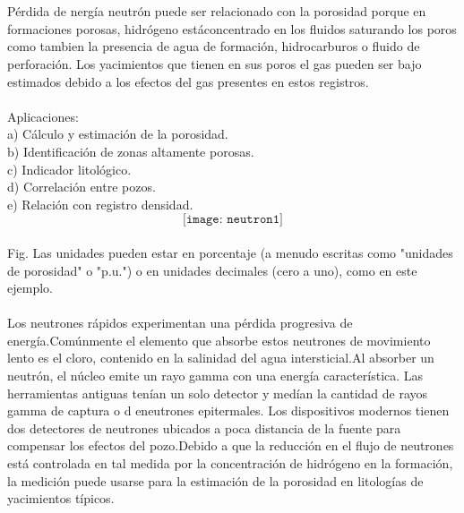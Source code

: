 \documentclass[10pt,a4paper]{report}
\begin{document}
\\\\ Pérdida de nergía neutrón puede ser relacionado con la porosidad porque en formaciones porosas, hidrógeno estáconcentrado en los fluidos saturando los poros como tambien la presencia de agua de formación, hidrocarburos o fluido de perforación. Los yacimientos que tienen en sus poros el gas pueden ser bajo estimados debido a los efectos del gas presentes en estos registros.
\\\\Aplicaciones: 
\\ a) Cálculo y estimación de la porosidad.
\\ b) Identificación de zonas altamente porosas.
\\ c) Indicador litológico. 
\\ d) Correlación entre pozos.
\\ e) Relación con registro densidad.
\newpage
$$\texttt{[image: neutron1]}$$
\\ Fig. Las unidades pueden estar en porcentaje (a menudo escritas como "unidades de porosidad" o "p.u.") o en unidades decimales (cero a uno), como en este ejemplo.
\\\\ Los neutrones rápidos experimentan una pérdida progresiva de energía.Comúnmente el elemento que absorbe estos neutrones de movimiento lento es el cloro, contenido en la salinidad del agua intersticial.Al absorber un neutrón, el núcleo emite un rayo gamma con una energía característica. Las herramientas antiguas tenían un solo detector y medían la cantidad de rayos gamma de captura o d eneutrones epitermales. Los dispositivos modernos tienen dos detectores de neutrones ubicados a poca distancia de la fuente para compensar los efectos del pozo.Debido a que la reducción en el flujo de neutrones está controlada en tal medida por la concentración de hidrógeno en la formación, la medición puede usarse para la estimación de la porosidad en litologías de yacimientos típicos.
\end{document}
